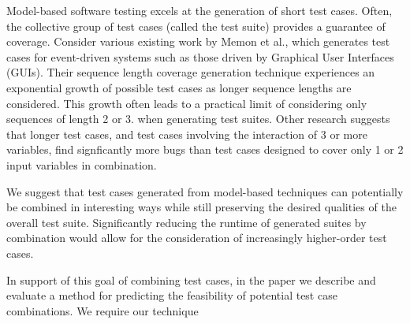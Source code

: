 Model-based software testing excels at the generation of short test cases. Often,
the collective group of test cases (called the test suite) provides a guarantee
of coverage. Consider various existing work by Memon et al., which generates test
cases for event-driven systems such as those driven by Graphical User Interfaces
(GUIs). Their sequence length coverage generation technique experiences an
exponential growth of possible test cases as longer sequence lengths are considered. This
growth often leads to a practical limit of considering only sequences of length 2 or 3.
when generating test suites. Other research suggests that longer test cases, and test
cases involving the interaction of 3 or more variables, find signficantly more
bugs than test cases designed to cover only 1 or 2 input variables in combination.

We suggest that test cases generated from model-based techniques can potentially be
combined in interesting ways while still preserving the desired qualities of the overall
test suite. Significantly reducing the runtime of generated suites by combination would allow
for the consideration of increasingly higher-order test cases.

In support of this goal of combining test cases, in the paper we describe and
evaluate a method for predicting the feasibility of potential test case
combinations. We require our technique
